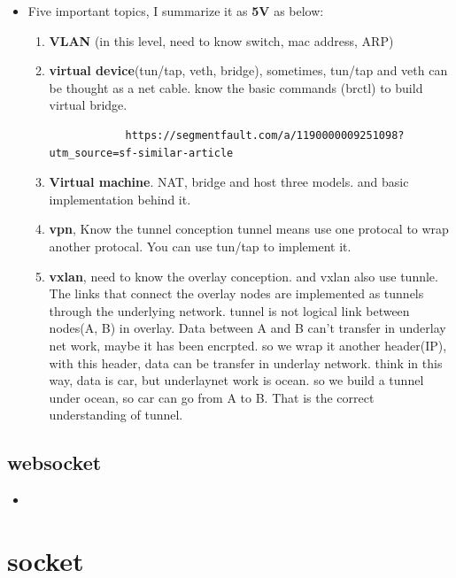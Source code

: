 \documentclass[a4paper,11pt,twoside]{book}
\begin{document}
\begin{itemize}
	\item Five important topics, I summarize it as \textbf{5V} as below: 
	\begin{enumerate}
		\item \textbf{VLAN} (in this level, need to know switch, mac address, ARP)
		\item \textbf{virtual device}(tun/tap, veth, bridge), sometimes, tun/tap and veth can be thought as a net cable. know the basic commands (brctl) to build virtual bridge.
		\begin{lstlisting}
			https://segmentfault.com/a/1190000009251098?utm_source=sf-similar-article
		\end{lstlisting}
		\item \textbf{Virtual machine}. NAT, bridge and host three models. and basic implementation behind it.
		\item \textbf{vpn}, Know the tunnel conception tunnel means use one protocal to wrap another protocal. You can use tun/tap to implement it. 
		\item \textbf{vxlan}, need to know the overlay conception. and vxlan also use tunnle.   The links that connect the overlay nodes are implemented as tunnels through the underlying network. tunnel is not logical link between nodes(A, B) in overlay.  Data between A and B can't transfer in underlay net work, maybe it has been encrpted. so we wrap it another header(IP), with this header, data can be transfer in underlay network.  think in this way, data is car, but underlaynet work is ocean. so we build a tunnel under ocean, so car can go from A to B. That is the correct understanding of tunnel. 
	\end{enumerate}
\end{itemize}

\subsection{websocket}
\begin{itemize}
	\item 
\end{itemize}

\section{socket}
\end{document}
